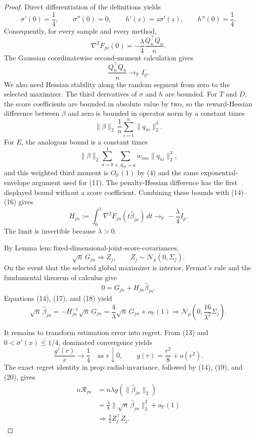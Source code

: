 \documentclass{article}
\begin{document}
\begin{proof}
Direct differentiation of the definitions yields
\[
 \sigma'(0)=\frac14,
 \qquad \sigma''(0)=0,
 \qquad h'(z)=z\sigma'(z),
 \qquad h''(0)=\frac14.
\]
Consequently, for every sample and every method,
\[
 \nabla^2F_{jn}(0)
 =-\frac{\lambda}{4}\frac{Q_n^\top Q_n}{n}.
 \tag{15}
\]
The Gaussian coordinatewise second-moment calculation gives
\[
 \frac{Q_n^\top Q_n}{n}\longrightarrow_{\mathbb P}I_p.
 \tag{16}
\]
We also need Hessian stability along the random segment from zero to the
selected maximizer.  The third derivatives of \(\sigma\) and \(h\) are
bounded.  For \(T\) and \(D\), the score coefficients are bounded in
absolute value by two, so the reward-Hessian difference between \(\beta\)
and zero is bounded in operator norm by a constant times
\[
 \|\beta\|_2\,\frac1n\sum_{i=1}^n\|q_{ni}\|_2^3.
\]
For \(E\), the analogous bound is a constant times
\[
 \|\beta\|_2
 \sum_{a=0}^1\sum_{i:A_{ni}=a}w_{ian}\|q_{ni}\|_2^3,
\]
and this weighted third moment is \(O_{\mathbb P}(1)\) by (4) and the same
exponential-envelope argument used for (11).  The penalty-Hessian difference
has the first displayed bound without a score coefficient.  Combining these
bounds with (14)--(16) gives
\[
 H_{jn}:=\int_0^1\nabla^2F_{jn}(t\widehat\beta_{jn})\,dt
 \longrightarrow_{\mathbb P}-\frac{\lambda}{4}I_p.
 \tag{17}
\]
The limit is invertible because \(\lambda>0\).

By Lemma
\(\mathrm{lem{:}fixed\mbox{-}dimensional\mbox{-}joint\mbox{-}score\mbox{-}covariances}\),
\[
 \sqrt n\,G_{jn}\Rightarrow Z_j,
 \qquad Z_j\sim\mathcal N_p(0,\Sigma_j).
 \tag{18}
\]
On the event that the selected global maximizer is interior, Fermat's rule
and the fundamental theorem of calculus give
\[
 0=G_{jn}+H_{jn}\widehat\beta_{jn}.
\]
Equations (14), (17), and (18) yield
\[
 \sqrt n\,\widehat\beta_{jn}
 =-H_{jn}^{-1}\sqrt n\,G_{jn}
 =\frac4\lambda\sqrt n\,G_{jn}+o_{\mathbb P}(1)
 \Rightarrow
 \mathcal N_p\!\left(0,\frac{16}{\lambda^2}\Sigma_j\right).
 \tag{19}
\]

It remains to transform estimation error into regret.  From (13) and
\(0<\sigma'(x)\le1/4\), dominated convergence yields
\[
 \frac{g'(r)}r\longrightarrow\frac14
 \quad\text{as }r\downarrow0,
 \qquad
 g(r)=\frac{r^2}{8}+o(r^2).
 \tag{20}
\]
The exact regret identity in
\(\mathrm{prop{:}radial\mbox{-}invariance}\), followed by (14), (19), and
(20), gives
\[
 \begin{aligned}
 n\mathcal R_{jn}
 &=n\lambda g(\|\widehat\beta_{jn}\|_2)\\
 &=\frac{\lambda}{8}\|\sqrt n\,\widehat\beta_{jn}\|_2^2
   +o_{\mathbb P}(1)\\
 &\Rightarrow \frac2\lambda Z_j^\top Z_j.
 \end{aligned}
 \tag{21}
\]


\end{proof}
\end{document}
